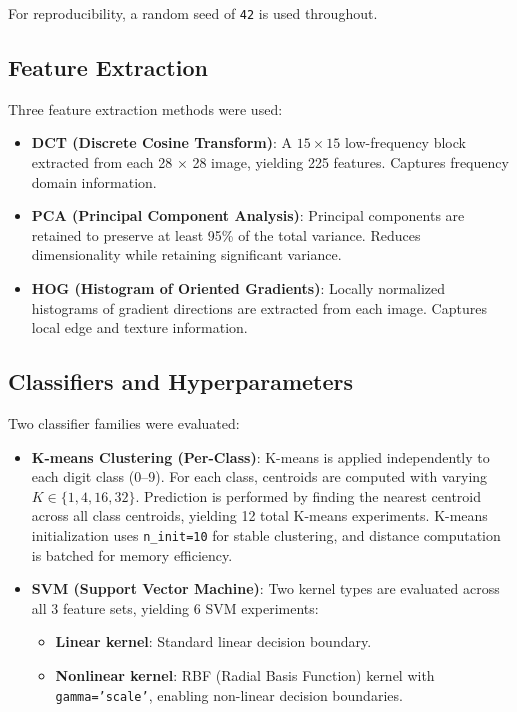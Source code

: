 For reproducibility, a random seed of \texttt{42} is used throughout.

\subsection{Feature Extraction}

Three feature extraction methods were used:

\begin{itemize}
    \item \textbf{DCT (Discrete Cosine Transform)}: A $15 \times 15$ low-frequency block extracted from each 28 × 28 image, yielding 225 features. Captures frequency domain information.
    \item \textbf{PCA (Principal Component Analysis)}: Principal components are retained to preserve at least 95\% of the total variance. Reduces dimensionality while retaining significant variance.
    \item \textbf{HOG (Histogram of Oriented Gradients)}: Locally normalized histograms of gradient directions are extracted from each image. Captures local edge and texture information.
\end{itemize}

\subsection{Classifiers and Hyperparameters}

Two classifier families were evaluated:

\begin{itemize}
    \item \textbf{K-means Clustering (Per-Class)}:\newline
        K-means is applied independently to each digit class (0--9). For each class, centroids are computed with varying $K \in \{1, 4, 16, 32\}$. Prediction is performed by finding the nearest centroid across all class centroids, yielding 12 total K-means experiments. K-means initialization uses \texttt{n\_init=10} for stable clustering, and distance computation is batched for memory efficiency.
    \item \textbf{SVM (Support Vector Machine)}:\newline
        Two kernel types are evaluated across all 3 feature sets, yielding 6 SVM experiments:
        \begin{itemize}
            \item \textbf{Linear kernel}: Standard linear decision boundary.
            \item \textbf{Nonlinear kernel}: RBF (Radial Basis Function) kernel with \texttt{gamma='scale'}, enabling non-linear decision boundaries.
        \end{itemize}
\end{itemize}

